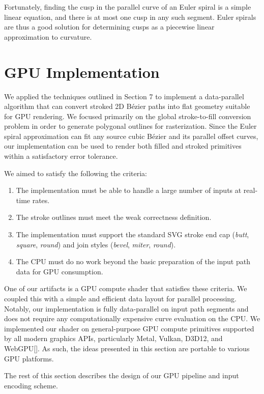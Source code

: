 \documentclass[sigconf]{acmart}
\begin{document}
Fortunately, finding the cusp in the parallel curve of an Euler spiral is a simple linear equation, and there is at most one cusp in any such segment. Euler spirals are thus a good solution for determining cusps as a piecewise linear approximation to curvature.

\section{GPU Implementation} \label{section:gpu-impl}

We applied the techniques outlined in Section 7 to implement a data-parallel algorithm that can convert stroked 2D Bézier paths into flat geometry suitable for GPU rendering. We focused primarily on the global stroke-to-fill conversion problem in order to generate polygonal outlines for rasterization. Since the Euler spiral approximation can fit any source cubic Bézier and its parallel offset curves, our implementation can be used to render both filled and stroked primitives within a satisfactory error tolerance.

We aimed to satisfy the following the criteria:
\begin{enumerate}
  \item The implementation must be able to handle a large number of inputs at real-time rates. 
  \item The stroke outlines must meet the weak correctness definition.
  \item The implementation must support the standard SVG stroke end cap (\emph{butt}, \emph{square}, \emph{round}) and join styles (\emph{bevel}, \emph{miter}, \emph{round}).
  \item The CPU must do no work beyond the basic preparation of the input path data for GPU consumption.
\end{enumerate}

One of our artifacts is a GPU compute shader that satisfies these criteria. We coupled this with a simple and efficient data layout for parallel processing. Notably, our implementation is fully data-parallel on input path segments and does not require any computationally expensive curve evaluation on the CPU. We implemented our shader on general-purpose GPU compute primitives supported by all modern graphics APIs, particularly Metal, Vulkan, D3D12, and WebGPU[]. As such, the ideas presented in this section are portable to various GPU platforms.

The rest of this section describes the design of our GPU pipeline and input encoding scheme.
\end{document}
